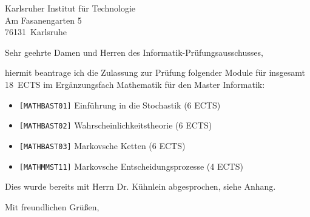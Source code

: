 \documentclass[a4paper, 12pt, KOMAold]{scrlttr2}
\newcommand{\Empfaenger}{Karlsruher Institut für Technologie} %
\newcommand{\EStrasse}{Am Fasanengarten 5}  %
\newcommand{\EPLZ}{76131}                   %
\newcommand{\EOrt}{Karlsruhe}               %
\newcommand{\DocTitle}{Antrag auf Prüfungszulassung} %
\begin{document}
    \begin{letter}{\Empfaenger \\ \EStrasse \\ \EPLZ~\EOrt}
    \date{\today}%
    \subject{\DocTitle}
    \opening{Sehr geehrte Damen und Herren des Informatik-Prüfungsausschusses,}

    hiermit beantrage ich die Zulassung zur Prüfung folgender Module für
    insgesamt 18~ECTS im Ergänzungsfach Mathematik für den Master Informatik:

    \begin{itemize}
        \item \texttt{[MATHBAST01]} Einführung in die Stochastik (6 ECTS)
        \item \texttt{[MATHBAST02]} Wahrscheinlichkeitstheorie (6 ECTS)
        \item \texttt{[MATHBAST03]} Markovsche Ketten (6 ECTS)
        \item \texttt{[MATHMMST11]} Markovsche Entscheidungsprozesse (4 ECTS)
    \end{itemize}

     Dies wurde bereits mit Herrn Dr. Kühnlein abgesprochen, siehe Anhang.
 
    \closing{Mit freundlichen Grüßen,}
    \end{letter}
\end{document}
